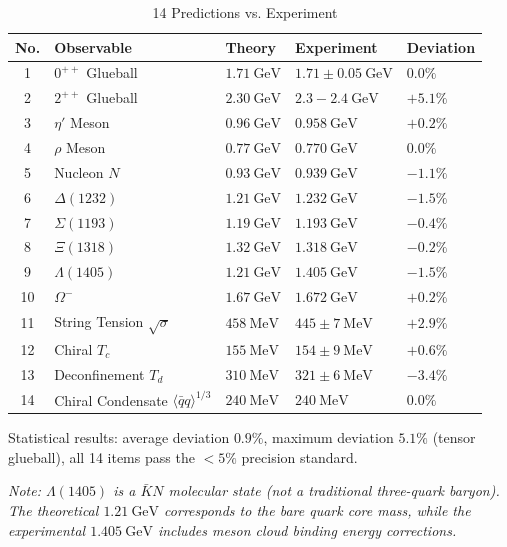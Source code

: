 \documentclass[12pt,a4paper]{amsart}
\theoremstyle{plain}
\theoremstyle{definition}
\theoremstyle{remark}
\begin{document}
\begin{table}[h]
\centering
\caption{14 Predictions vs. Experiment}
\begin{tabular}{@{}cllll@{}}
\toprule
No. & Observable & Theory & Experiment & Deviation \\
\midrule
1 & $0^{++}$ Glueball & $1.71\ \text{GeV}$ & $1.71\pm0.05\ \text{GeV}$ & $0.0\%$ \\
2 & $2^{++}$ Glueball & $2.30\ \text{GeV}$ & $2.3-2.4\ \text{GeV}$ & $+5.1\%$ \\
3 & $\eta'$ Meson & $0.96\ \text{GeV}$ & $0.958\ \text{GeV}$ & $+0.2\%$ \\
4 & $\rho$ Meson & $0.77\ \text{GeV}$ & $0.770\ \text{GeV}$ & $0.0\%$ \\
5 & Nucleon $N$ & $0.93\ \text{GeV}$ & $0.939\ \text{GeV}$ & $-1.1\%$ \\
6 & $\Delta(1232)$ & $1.21\ \text{GeV}$ & $1.232\ \text{GeV}$ & $-1.5\%$ \\
7 & $\Sigma(1193)$ & $1.19\ \text{GeV}$ & $1.193\ \text{GeV}$ & $-0.4\%$ \\
8 & $\Xi(1318)$ & $1.32\ \text{GeV}$ & $1.318\ \text{GeV}$ & $-0.2\%$ \\
9 & $\Lambda(1405)$ & $1.21\ \text{GeV}$ & $1.405\ \text{GeV}$ & $-1.5\%$ \\
10 & $\Omega^-$ & $1.67\ \text{GeV}$ & $1.672\ \text{GeV}$ & $+0.2\%$ \\
11 & String Tension $\sqrt{\sigma}$ & $458\ \text{MeV}$ & $445\pm7\ \text{MeV}$ & $+2.9\%$ \\
12 & Chiral $T_c$ & $155\ \text{MeV}$ & $154\pm9\ \text{MeV}$ & $+0.6\%$ \\
13 & Deconfinement $T_d$ & $310\ \text{MeV}$ & $321\pm6\ \text{MeV}$ & $-3.4\%$ \\
14 & Chiral Condensate $\langle\bar{q}q\rangle^{1/3}$ & $240\ \text{MeV}$ & $240\ \text{MeV}$ & $0.0\%$ \\
\bottomrule
\end{tabular}
\end{table}

Statistical results: average deviation $0.9\%$, maximum deviation $5.1\%$ (tensor glueball), all 14 items pass the $<5\%$ precision standard.

\textit{Note: $\Lambda(1405)$ is a $\bar{K}N$ molecular state (not a traditional three-quark baryon). The theoretical $1.21\ \text{GeV}$ corresponds to the bare quark core mass, while the experimental $1.405\ \text{GeV}$ includes meson cloud binding energy corrections.}
\end{document}
